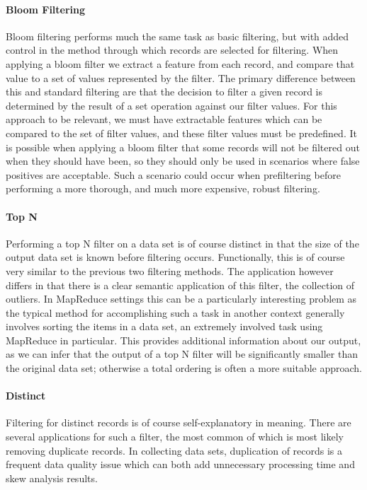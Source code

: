 \paragraph{Bloom Filtering}
Bloom filtering performs much the same task as basic filtering, but with added control in the method through which records are selected for filtering. When applying a bloom filter we extract a feature from each record, and compare that value to a set of values represented by the filter. The primary difference between this and standard filtering are that the decision to filter a given record is determined by the result of a set operation against our filter values. For this approach to be relevant, we must have extractable features which can be compared to the set of filter values, and these filter values must be predefined. It is possible when applying a bloom filter that some records will not be filtered out when they should have been, so they should only be used in scenarios where false positives are acceptable. Such a scenario could occur when prefiltering before performing a more thorough, and much more expensive, robust filtering.

\paragraph{Top N}
Performing a top N filter on a data set is of course distinct in that the size of the output data set is known before filtering occurs. Functionally, this is of course very similar to the previous two filtering methods. The application however differs in that there is a clear semantic application of this filter, the collection of outliers. In MapReduce settings this can be a particularly interesting problem as the typical method for accomplishing such a task in another context generally involves sorting the items in a data set, an extremely involved task using MapReduce in particular. This provides additional information about our output, as we can infer that the output of a top N filter will be significantly smaller than the original data set; otherwise a total ordering is often a more suitable approach.

\paragraph{Distinct}
Filtering for distinct records is of course self-explanatory in meaning. There are several applications for such a filter, the most common of which is most likely removing duplicate records. In collecting data sets, duplication of records is a frequent data quality issue which can both add unnecessary processing time and skew analysis results. 


